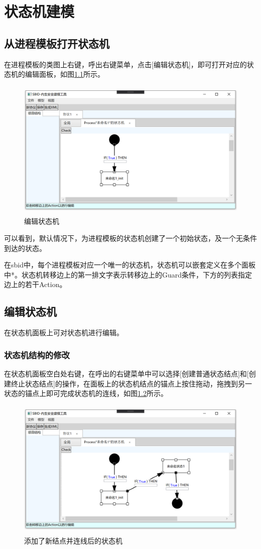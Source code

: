 \chapter{状态机建模}

\section{从进程模板打开状态机}
在进程模板的类图上右键，呼出右键菜单，点击[编辑状态机]，即可打开对应的状态机的编辑面板，如图\ref{statemachine_panel}所示。
\begin{figure}[h]
	\centering
	\includegraphics[width=12cm,height=6.75cm]{imgs/statemachine_panel.png}
	\caption{编辑状态机}
	\label{statemachine_panel}
\end{figure}
\par
可以看到，默认情况下，为进程模板的状态机创建了一个初始状态，及一个无条件到达的状态。
\par
在sbid中，每个进程模板对应一个唯一的状态机，状态机可以嵌套定义在多个面板中*。状态机转移边上的第一排文字表示转移边上的Guard条件，下方的列表指定边上的若干Action。

\section{编辑状态机}
在状态机面板上可对状态机进行编辑。
\subsection{状态机结构的修改}
在状态机面板空白处右键，在呼出的右键菜单中可以选择[创建普通状态结点]和[创建终止状态结点]的操作，在面板上的状态机结点的锚点上按住拖动，拖拽到另一状态的锚点上即可完成状态机的连线，如图\ref{statemachine_edit_structure}所示。
\begin{figure}[h]
	\centering
	\includegraphics[width=12cm,height=6.75cm]{imgs/statemachine_edit_structure.png}
	\caption{添加了新结点并连线后的状态机}
	\label{statemachine_edit_structure}
\end{figure}
